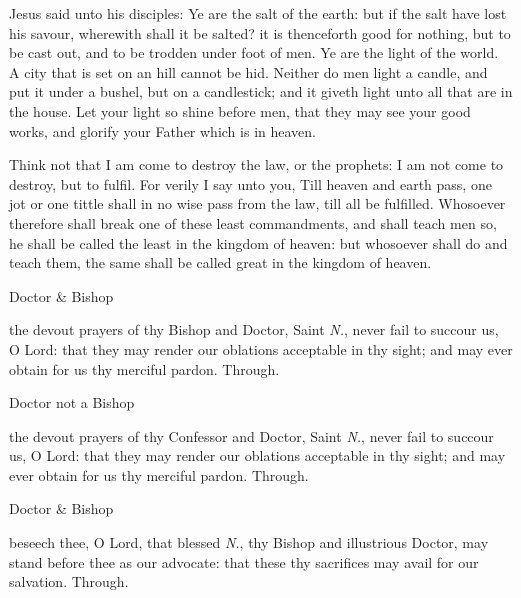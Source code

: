 \label{CommonDoctorsGospel}
 Jesus said unto his disciples: Ye are the salt of the earth: but if the salt have lost his savour, wherewith shall it be salted? it is thenceforth good for nothing, but to be cast out, and to be trodden under foot of men. Ye are the light of the world. A city that is set on an hill cannot be hid. Neither do men light a candle, and put it under a bushel, but on a candlestick; and it giveth light unto all that are in the house. Let your light so shine before men, that they may see your good works, and glorify your Father which is in heaven.\par
Think not that I am come to destroy the law, or the prophets: I am not come to destroy, but to fulfil. For verily I say unto you, Till heaven and earth pass, one jot or one tittle shall in no wise pass from the law, till all be fulfilled. Whosoever therefore shall break one of these least commandments, and shall teach men so, he shall be called the least in the kingdom of heaven: but whosoever shall do and teach them, the same shall be called great in the kingdom of heaven.


\clearpage
\secret
\begin{inhead}
	Doctor \& Bishop
\end{inhead}
 the devout prayers of thy Bishop and Doctor, Saint \textit{N.}, never fail to succour us, O Lord: that they may render our oblations acceptable in thy sight; and may ever obtain for us thy merciful pardon. Through.

\begin{inhead}
	Doctor not a Bishop
\end{inhead}
 the devout prayers of thy Confessor and Doctor, Saint \textit{N.}, never fail to succour us, O Lord: that they may render our oblations acceptable in thy sight; and may ever obtain for us thy merciful pardon. Through.


\postcommunion
\begin{inhead}
	Doctor \& Bishop
\end{inhead}
 beseech thee, O Lord, that blessed \textit{N.}, thy Bishop and illustrious Doctor, may stand before thee as our advocate: that these thy sacrifices may avail for our salvation. Through.

